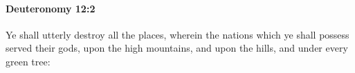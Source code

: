 
		\paragraph{Deuteronomy 12:2} %
			\label{DEUTERONOMY-12-2}

			Ye shall utterly destroy all the places, wherein the nations which ye shall possess served their gods, upon the high mountains, and upon the hills, and under every green tree:


